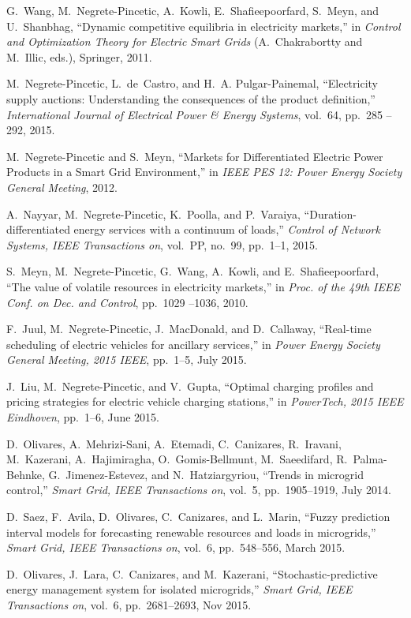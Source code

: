 
\begin{thebibliography}{10}

G.~Wang, M.~Negrete-Pincetic, A.~Kowli, E.~Shafieepoorfard, S.~Meyn, and
  U.~Shanbhag, ``Dynamic competitive equilibria in electricity markets,'' in
  {\em Control and Optimization Theory for Electric Smart Grids}
  (A.~Chakrabortty and M.~Illic, eds.), Springer, 2011.

M.~Negrete-Pincetic, L.~de~Castro, and H.~A. Pulgar-Painemal, ``Electricity
  supply auctions: Understanding the consequences of the product definition,''
  {\em International Journal of Electrical Power \& Energy Systems}, vol.~64,
  pp.~285 -- 292, 2015.

M.~Negrete-Pincetic and S.~Meyn, ``{Markets for Differentiated Electric Power
  Products in a Smart Grid Environment},'' in {\em IEEE PES 12: Power Energy
  Society General Meeting}, 2012.

A.~Nayyar, M.~Negrete-Pincetic, K.~Poolla, and P.~Varaiya,
  ``Duration-differentiated energy services with a continuum of loads,'' {\em
  Control of Network Systems, IEEE Transactions on}, vol.~PP, no.~99, pp.~1--1,
  2015.

S.~Meyn, M.~Negrete-Pincetic, G.~Wang, A.~Kowli, and E.~Shafieepoorfard, ``The
  value of volatile resources in electricity markets,'' in {\em Proc. of the
  49th IEEE Conf. on Dec. and Control}, pp.~1029 --1036, 2010.

F.~Juul, M.~Negrete-Pincetic, J.~MacDonald, and D.~Callaway, ``Real-time
  scheduling of electric vehicles for ancillary services,'' in {\em Power
  Energy Society General Meeting, 2015 IEEE}, pp.~1--5, July 2015.

J.~Liu, M.~Negrete-Pincetic, and V.~Gupta, ``Optimal charging profiles and
  pricing strategies for electric vehicle charging stations,'' in {\em
  PowerTech, 2015 IEEE Eindhoven}, pp.~1--6, June 2015.

D.~Olivares, A.~Mehrizi-Sani, A.~Etemadi, C.~Canizares, R.~Iravani,
  M.~Kazerani, A.~Hajimiragha, O.~Gomis-Bellmunt, M.~Saeedifard,
  R.~Palma-Behnke, G.~Jimenez-Estevez, and N.~Hatziargyriou, ``Trends in
  microgrid control,'' {\em Smart Grid, IEEE Transactions on}, vol.~5,
  pp.~1905--1919, July 2014.

D.~Saez, F.~Avila, D.~Olivares, C.~Canizares, and L.~Marin, ``Fuzzy prediction
  interval models for forecasting renewable resources and loads in
  microgrids,'' {\em Smart Grid, IEEE Transactions on}, vol.~6, pp.~548--556,
  March 2015.

D.~Olivares, J.~Lara, C.~Canizares, and M.~Kazerani, ``Stochastic-predictive
  energy management system for isolated microgrids,'' {\em Smart Grid, IEEE
  Transactions on}, vol.~6, pp.~2681--2693, Nov 2015.

\end{thebibliography}


